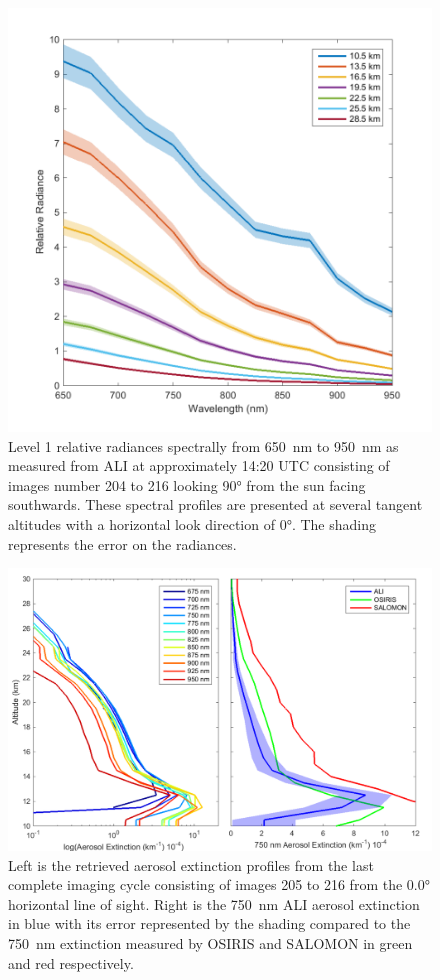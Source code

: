 \documentclass[12pt]{article}
\begin{document}
\begin{figure}
\includegraphics[width=1.0\textwidth]{./Images/5-2-AliSpectralRadiances.pdf}
    \caption{Level 1 relative radiances spectrally from 650~nm to 950~nm as measured from ALI at approximately 14:20 UTC consisting of images number 204 to 216 looking 90\si{\degree} from the sun facing southwards. These spectral profiles are presented at several tangent altitudes with a horizontal look direction of 0\si{\degree}. The shading represents the error on the radiances. }
    \label{fig:AliSpectralRadiances}
\end{figure}

\newpage

\begin{figure}
\includegraphics[width=1.0\textwidth]{./Images/5-3-FullAerosolCycleComparison.pdf}
    \caption{Left is the retrieved aerosol extinction profiles from the last complete imaging cycle consisting of images 205 to 216 from the 0.0\si{\degree} horizontal line of sight. Right is the 750~nm ALI aerosol extinction in blue with its error represented by the shading compared to the 750~nm extinction measured by OSIRIS and SALOMON in green and red respectively.}
    \label{fig:AliAerosolCycle}
\end{figure}
\end{document}
